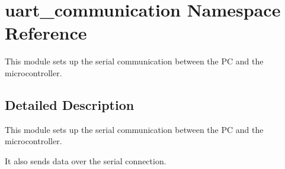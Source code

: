 \hypertarget{namespaceuart__communication}{}\section{uart\+\_\+communication Namespace Reference}
\label{namespaceuart__communication}


This module sets up the serial communication between the PC and the microcontroller.  




\subsection{Detailed Description}
This module sets up the serial communication between the PC and the microcontroller. 

It also sends data over the serial connection. 